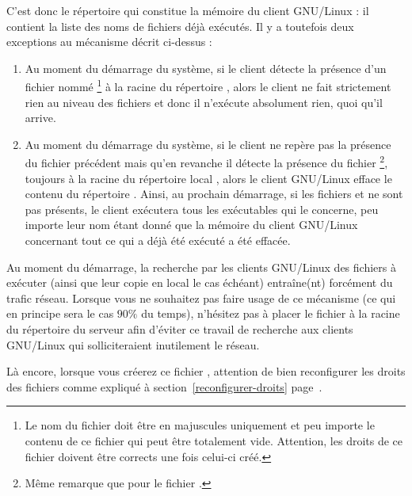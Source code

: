C'est donc le répertoire 
qui constitue la \og mémoire \fg{}
du client GNU/Linux : il contient la liste des noms de fichiers déjà exécutés. Il y
a toutefois deux exceptions au mécanisme décrit ci-dessus :
%
\begin{enumerate}

\item Au moment du démarrage du système, si le client détecte la
présence d'un fichier nommé %
%
\footnote{Le nom du fichier doit être
en majuscules uniquement et peu importe le contenu de ce fichier qui peut être
totalement vide. Attention, les droits de ce fichier doivent être corrects une fois
celui-ci créé.}
%
à la racine du répertoire ,
alors le client ne fait strictement
rien au niveau des fichiers 
et donc il n'exécute absolument rien, quoi qu'il arrive.

\item Au moment du démarrage du système, si le client
ne repère pas la présence du fichier  précédent mais qu'en
revanche il détecte la présence du fichier %
%
\footnote{Même
remarque que pour le fichier .},
%
toujours à la racine
du répertoire local , alors le client GNU/Linux efface
le contenu du répertoire . Ainsi, au prochain
démarrage,
si les fichiers  et  ne sont pas présents,
le client exécutera tous les exécutables  qui le concerne,
peu importe leur nom
étant donné que la \og mémoire \fg{} du client GNU/Linux
concernant tout ce qui a déjà été exécuté a été effacée.
\end{enumerate}


\begin{alerte}
Au moment du démarrage, la recherche par les clients GNU/Linux
des fichiers  à exécuter (ainsi que leur 
copie en local le cas échéant) entraîne(nt) forcément du trafic réseau.
Lorsque vous ne souhaitez pas faire usage de ce mécanisme (ce qui en principe
sera le cas $90\%$ du temps),
n'hésitez pas à placer le fichier  à la racine
du répertoire  du serveur afin d'éviter ce travail
de recherche aux clients GNU/Linux qui solliciteraient inutilement le
réseau.

Là encore, lorsque vous créerez ce fichier , attention
de bien reconfigurer les droits des fichiers comme expliqué
à section~\ref{reconfigurer-droits} page~\pageref{reconfigurer-droits}.
\end{alerte}





